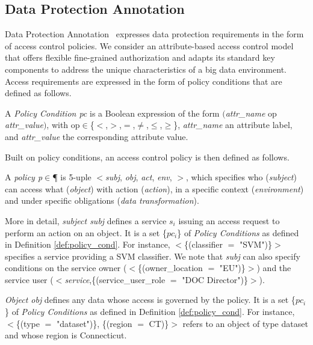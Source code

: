       \subsection{Data Protection Annotation}\label{sec:nonfuncannotation}
      Data Protection Annotation \myLambda\ expresses data protection requirements in the form of access control policies. We consider an attribute-based access control model that offers flexible fine-grained authorization and adapts its standard key components to address the unique characteristics of a big data environment. Access requirements are expressed in the form of policy conditions that are defined as follows.

      \begin{definition}\label{def:policy_cond}
        A \emph{Policy Condition pc} is a Boolean expression of the form $($\emph{attr\_name} op \emph{attr\_value}$)$, with op$\in$\{$<$,$>$,$=$,$\neq$,$\leq$,$\geq$\}, \emph{attr\_name} an attribute label, and \emph{attr\_value} the corresponding attribute value.
      \end{definition}

      Built on policy conditions, an access control policy is then defined as follows.

      \begin{definition}[Policy]\label{def:policy_rule}
        A {\it policy p}$\in$\P{} is 5-uple $<$\textit{subj}, \textit{obj}, \textit{act}, \textit{env}, \textit{\TP}$>$, which specifies who (\emph{subject}) can access what (\emph{object}) with action (\emph{action}), in a specific context (\emph{environment}) and under specific obligations (\emph{data transformation}).
      \end{definition}

      More in detail, \textit{subject subj} defines a service $s_i$ issuing an access request to perform an action on an object. It is a set \{$pc_i$\} of \emph{Policy Conditions} as defined in Definition \ref{def:policy_cond}. For instance, $<$\{(classifier $=$ "SVM")\}$>$ specifies a service providing a SVM classifier. We note that \textit{subj} can also specify conditions on the service owner ($<$\{(owner\_location $=$ "EU")\}$>$) and the service user ($<$\emph{service},\{(service\_user\_role $=$ "DOC Director")\}$>$).

      \textit{Object obj} defines any data whose access is governed by the policy. It is a set \{$pc_i$\} of \emph{Policy Conditions} as defined in Definition \ref{def:policy_cond}.
      For instance, $<$\{(type $=$ "dataset")\}, \{(region $=$ CT)\}$>$ refers to an object of type dataset and whose region is Connecticut.

